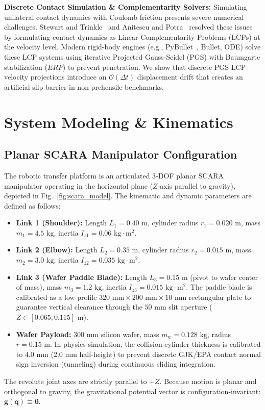 \documentclass{article}
\begin{document}
\textbf{Discrete Contact Simulation \& Complementarity Solvers:} Simulating unilateral contact dynamics with Coulomb friction presents severe numerical challenges. Stewart and Trinkle~\cite{stewart2000rigid} and Anitescu and Potra~\cite{anitescu1997formulating} resolved these issues by formulating contact dynamics as Linear Complementarity Problems (LCPs) at the velocity level. Modern rigid-body engines (e.g., PyBullet~\cite{coumans2016pybullet}, Bullet, ODE) solve these LCP systems using iterative Projected Gauss-Seidel (PGS) with Baumgarte stabilization ($ERP$) to prevent penetration. We show that discrete PGS LCP velocity projections introduce an $\mathcal{O}(\Delta t)$ displacement drift that creates an artificial slip barrier in non-prehensile benchmarks.

\section{System Modeling \& Kinematics}

\subsection{Planar SCARA Manipulator Configuration}
The robotic transfer platform is an articulated 3-DOF planar SCARA manipulator operating in the horizontal plane ($Z$-axis parallel to gravity), depicted in Fig.~\ref{fig:scara_model}. The kinematic and dynamic parameters are defined as follows:
\begin{itemize}
    \item \textbf{Link 1 (Shoulder):} Length $L_1 = 0.40\text{ m}$, cylinder radius $r_1 = 0.020\text{ m}$, mass $m_1 = 4.5\text{ kg}$, inertia $I_{z1} = 0.06\text{ kg}\cdot\text{m}^2$.
    \item \textbf{Link 2 (Elbow):} Length $L_2 = 0.35\text{ m}$, cylinder radius $r_2 = 0.015\text{ m}$, mass $m_2 = 3.0\text{ kg}$, inertia $I_{z2} = 0.035\text{ kg}\cdot\text{m}^2$.
    \item \textbf{Link 3 (Wafer Paddle Blade):} Length $L_3 = 0.15\text{ m}$ (pivot to wafer center of mass), mass $m_3 = 1.2\text{ kg}$, inertia $I_{z3} = 0.015\text{ kg}\cdot\text{m}^2$. The paddle blade is calibrated as a low-profile $320\text{ mm} \times 200\text{ mm} \times 10\text{ mm}$ rectangular plate to guarantee vertical clearance through the $50\text{ mm}$ slit aperture ($Z \in [0.065, 0.115]\text{ m}$).
    \item \textbf{Wafer Payload:} $300\text{ mm}$ silicon wafer, mass $m_w = 0.128\text{ kg}$, radius $r = 0.15\text{ m}$. In physics simulation, the collision cylinder thickness is calibrated to $4.0\text{ mm}$ ($2.0\text{ mm}$ half-height) to prevent discrete GJK/EPA contact normal sign inversion (tunneling) during continuous sliding integration.
\end{itemize}
The revolute joint axes are strictly parallel to $+Z$. Because motion is planar and orthogonal to gravity, the gravitational potential vector is configuration-invariant: $\mathbf{g}(\mathbf{q}) \equiv \mathbf{0}$.
\end{document}
